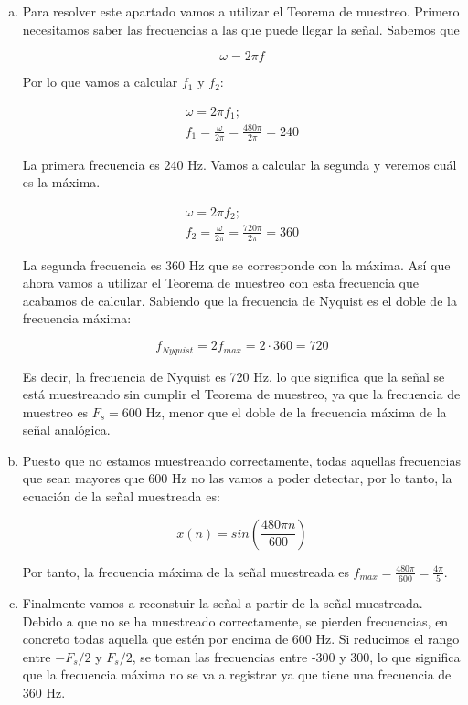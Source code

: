 \documentclass[11pt,a4paper]{article}
\begin{document}
\begin{enumerate}[a)]
	\item Para resolver este apartado vamos a utilizar el Teorema de muestreo. Primero necesitamos saber las frecuencias a las que puede llegar la señal. Sabemos que
	
	\[\omega = 2\pi f\]
	
	Por lo que vamos a calcular $f_1$ y $f_2$:

	\begin{gather*}
	\omega = 2\pi f_1;\\
	f_1 = \frac{\omega}{2\pi} = \frac{480\pi}{2\pi} = 240
	\end{gather*}
	
	La primera frecuencia es 240 Hz. Vamos a calcular la segunda y veremos cuál es la máxima.
	
	\begin{gather*}
	\omega = 2\pi f_2;\\
	f_2 = \frac{\omega}{2\pi} = \frac{720\pi}{2\pi} = 360
	\end{gather*}
	
	La segunda frecuencia es 360 Hz que se corresponde con la máxima. Así que ahora vamos a utilizar el Teorema de muestreo con esta frecuencia que acabamos de calcular. Sabiendo que la frecuencia de Nyquist es el doble de la frecuencia máxima:
	
	\[f_{Nyquist} = 2f_{max} = 2\cdot 360 = 720\]
	
	Es decir, la frecuencia de Nyquist es 720 Hz, lo que significa que la señal se está muestreando sin cumplir el Teorema de muestreo, ya que la frecuencia de muestreo es $F_s=600$ Hz, menor que el doble de la frecuencia máxima de la señal analógica.
	
	\item Puesto que no estamos muestreando correctamente, todas aquellas frecuencias que sean mayores que 600 Hz no las vamos a poder detectar, por lo tanto, la ecuación de la señal muestreada es:
	
	\[x(n) = sin\left( \frac{480\pi n}{600}\right) \]
	
	Por tanto, la frecuencia máxima de la señal muestreada es $f_{max} = \frac{480\pi}{600} = \frac{4\pi}{5}$.
	
	\item Finalmente vamos a reconstuir la señal a partir de la señal muestreada. Debido a que no se ha muestreado correctamente, se pierden frecuencias, en concreto todas aquella que estén por encima de 600 Hz. Si reducimos el rango entre $-F_s/2$ y $F_s/2$, se toman las frecuencias entre -300 y 300, lo que significa que la frecuencia máxima no se va a registrar ya que tiene una frecuencia de 360 Hz.\\
	

\end{enumerate}
\end{document}
